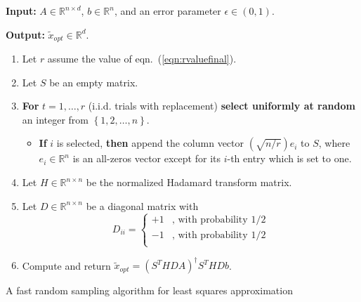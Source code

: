 \documentclass[11pt]{article}
\begin{document}
\begin{algorithm}[h]
\begin{framed}

\textbf{Input:} $A \in \mathbb{R}^{n \times d}$, $b \in
\mathbb{R}^n$, and an error parameter $\epsilon \in (0,1)$.

\vspace{0.1in}

\textbf{Output:} $\tilde{x}_{opt} \in \mathbb{R}^d$.

\begin{enumerate}

\item Let $r$ assume the value of eqn.~(\ref{eqn:rvaluefinal}).

\item Let $S$ be an empty matrix.

\item \textbf{For} $t=1,\ldots,r$ (i.i.d. trials with replacement) \textbf{select uniformly at random} an integer from $\left\{1,2,\ldots,n\right\}$.

\begin{itemize}

\item \textbf{If} $i$ is selected, \textbf{then} append the column vector $\left(\sqrt{n/r}\right) e_i$ to $S$, where $e_i \in \mathbb{R}^n$ is an all-zeros vector except for its $i$-th entry which is set to one.

\end{itemize}

\item Let $H \in \mathbb{R}^{n\times n}$ be the normalized Hadamard transform
matrix.

\item Let $D \in \mathbb{R}^{n \times n}$ be a diagonal matrix with
$$
D_{ii}
            = \left\{ \begin{array}{ll}
                         +1 & \mbox{, with probability $1/2$} \\
                         -1 & \mbox{, with probability $1/2$} \\
                      \end{array}
              \right.
$$
\item
Compute and return $\tilde{x}_{opt} = \left(S^THDA\right)^\dagger S^THDb $.
\end{enumerate}

\end{framed}
\caption{A fast random sampling algorithm for least squares
approximation} \label{alg:alg_sample_fast}
\end{algorithm}
\end{document}
